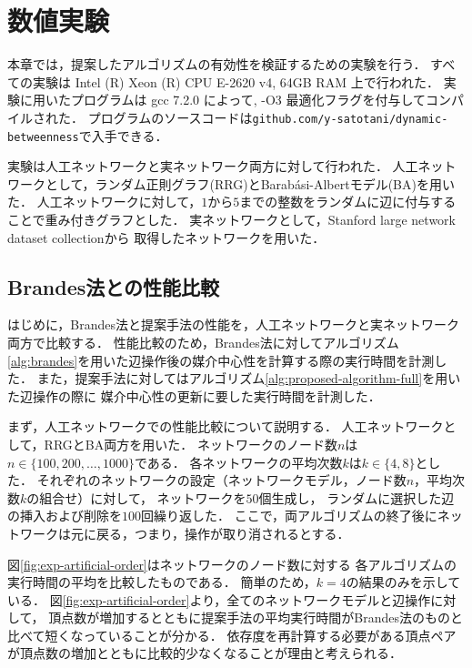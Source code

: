\chapter{数値実験}
\label{chap:experiment}

本章では，提案したアルゴリズムの有効性を検証するための実験を行う．
すべての実験は Intel (R) Xeon (R) CPU E-2620 v4, 64GB RAM 上で行われた．
実験に用いたプログラムは gcc 7.2.0 によって, -O3 最適化フラグを付与してコンパイルされた．
プログラムのソースコードは\verb|github.com/y-satotani/dynamic-betweenness|で入手できる．

実験は人工ネットワークと実ネットワーク両方に対して行われた．
人工ネットワークとして，ランダム正則グラフ(RRG)とBarab{\'{a}}si-Albertモデル(BA)を用いた．
人工ネットワークに対して，$1$から$5$までの整数をランダムに辺に付与することで重み付きグラフとした．
実ネットワークとして，Stanford large network dataset collection\cite{Leskovec2016}から
取得したネットワークを用いた．

\section{Brandes法との性能比較}
はじめに，Brandes法と提案手法の性能を，人工ネットワークと実ネットワーク両方で比較する．
性能比較のため，Brandes法に対してアルゴリズム\ref{alg:brandes}を用いた辺操作後の媒介中心性を計算する際の実行時間を計測した．
また，提案手法に対してはアルゴリズム\ref{alg:proposed-algorithm-full}を用いた辺操作の際に
媒介中心性の更新に要した実行時間を計測した．

まず，人工ネットワークでの性能比較について説明する．
人工ネットワークとして，RRGとBA両方を用いた．
ネットワークのノード数$n$は$n\in\{100,200,\ldots,1000\}$である．
各ネットワークの平均次数$k$は$k\in\{4,8\}$とした．
それぞれのネットワークの設定（ネットワークモデル，ノード数$n$，平均次数$k$の組合せ）に対して，
ネットワークを$50$個生成し，
ランダムに選択した辺の挿入および削除を$100$回繰り返した．
ここで，両アルゴリズムの終了後にネットワークは元に戻る，つまり，操作が取り消されるとする．

図\ref{fig:exp-artificial-order}はネットワークのノード数に対する
各アルゴリズムの実行時間の平均を比較したものである．
簡単のため，$k=4$の結果のみを示している．
図\ref{fig:exp-artificial-order}より，全てのネットワークモデルと辺操作に対して，
頂点数が増加するとともに提案手法の平均実行時間がBrandes法のものと比べて短くなっていることが分かる．
依存度を再計算する必要がある頂点ペアが頂点数の増加とともに比較的少なくなることが理由と考えられる．

